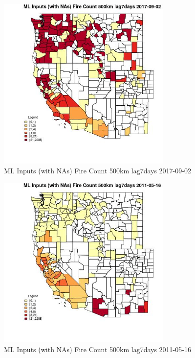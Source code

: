 \begin{figure} 
\centering  
\includegraphics[width=0.77\textwidth]{Code_Outputs/Report_ML_input_PM25_Step4_part_e_de_duplicated_aves_compiled_2019-05-21wNAs_CountyFire_Count_500km_lag7daysMean2017-09-02.jpg} 
\caption{\label{fig:Report_ML_input_PM25_Step4_part_e_de_duplicated_aves_compiled_2019-05-21wNAsCountyFire_Count_500km_lag7daysMean2017-09-02}ML Inputs (with NAs) Fire Count 500km lag7days 2017-09-02} 
\end{figure} 
 

\begin{figure} 
\centering  
\includegraphics[width=0.77\textwidth]{Code_Outputs/Report_ML_input_PM25_Step4_part_e_de_duplicated_aves_compiled_2019-05-21wNAs_CountyFire_Count_500km_lag7daysMean2011-05-16.jpg} 
\caption{\label{fig:Report_ML_input_PM25_Step4_part_e_de_duplicated_aves_compiled_2019-05-21wNAsCountyFire_Count_500km_lag7daysMean2011-05-16}ML Inputs (with NAs) Fire Count 500km lag7days 2011-05-16} 
\end{figure} 
 

